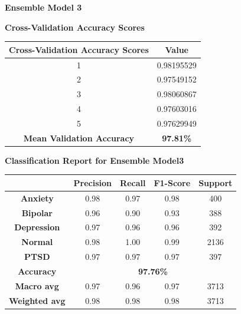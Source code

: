 \pagebreak

\noindent
\textbf{Ensemble Model 3}
\begin{center}
    \textbf{Cross-Validation Accuracy Scores} \\[0.5em]
    \begin{tabular}{|c|c|}
        \hline
        \textbf{Cross-Validation Accuracy Scores} & \textbf{Value} \\ \hline
        1 & 0.98195529 \\ \hline
        2 & 0.97549152 \\ \hline
        3 & 0.98060867 \\ \hline
        4 & 0.97603016 \\ \hline
        5 & 0.97629949 \\ \hline
        \textbf{Mean Validation Accuracy} & \textbf{97.81\%} \\ \hline
    \end{tabular}
\end{center}

\begin{center}
    \textbf{Classification Report for Ensemble Model3} \\[0.5em]
    \begin{tabular}{|c|c|c|c|c|}
        \hline
        & \textbf{Precision} & \textbf{Recall} & \textbf{F1-Score} & \textbf{Support} \\ \hline
        \textbf{Anxiety}    & 0.98 & 0.97 & 0.98 & 400  \\ \hline
        \textbf{Bipolar}    & 0.96 & 0.90 & 0.93 & 388  \\ \hline
        \textbf{Depression} & 0.97 & 0.96 & 0.96 & 392  \\ \hline
        \textbf{Normal}     & 0.98 & 1.00 & 0.99 & 2136 \\ \hline
        \textbf{PTSD}       & 0.97 & 0.97 & 0.97 & 397  \\ \hline
        \textbf{Accuracy}   & \multicolumn{4}{|c|}{\textbf{97.76\%}} \\ \hline
        \textbf{Macro avg}  & 0.97 & 0.96 & 0.97 & 3713 \\ \hline
        \textbf{Weighted avg} & 0.98 & 0.98 & 0.98 & 3713 \\ \hline
    \end{tabular}
\end{center}

